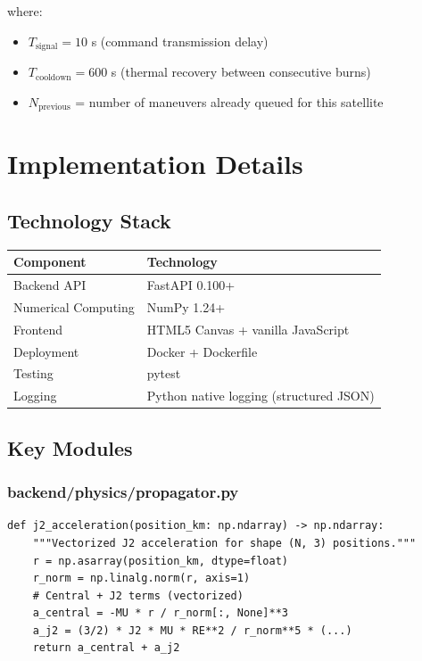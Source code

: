 \documentclass[11pt,a4paper]{article}
\begin{document}
where:
\begin{itemize}
    \item $T_{\text{signal}} = 10$ s (command transmission delay)
    \item $T_{\text{cooldown}} = 600$ s (thermal recovery between consecutive burns)
    \item $N_{\text{previous}}$ = number of maneuvers already queued for this satellite
\end{itemize}

\section{Implementation Details}

\subsection{Technology Stack}

\begin{table}[h!]
\centering
\begin{tabular}{|l|l|}
\hline
\textbf{Component} & \textbf{Technology} \\
\hline
Backend API & FastAPI 0.100+ \\
Numerical Computing & NumPy 1.24+ \\
Frontend & HTML5 Canvas + vanilla JavaScript \\
Deployment & Docker + Dockerfile \\
Testing & pytest \\
Logging & Python native logging (structured JSON) \\
\hline
\end{tabular}
\end{table}

\subsection{Key Modules}

\subsubsection{backend/physics/propagator.py}
\begin{lstlisting}
def j2_acceleration(position_km: np.ndarray) -> np.ndarray:
    """Vectorized J2 acceleration for shape (N, 3) positions."""
    r = np.asarray(position_km, dtype=float)
    r_norm = np.linalg.norm(r, axis=1)
    # Central + J2 terms (vectorized)
    a_central = -MU * r / r_norm[:, None]**3
    a_j2 = (3/2) * J2 * MU * RE**2 / r_norm**5 * (...)
    return a_central + a_j2
\end{lstlisting}
\end{document}

